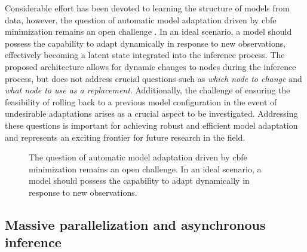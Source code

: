 Considerable effort has been devoted to learning the structure of models from data, however,
the question of automatic model adaptation driven by \ac{cbfe} minimization remains an open challenge \citep{beckers_principled_2022, friston_bayesian_2018}.
In an ideal scenario, a model should possess the capability to adapt dynamically in response
to new observations, effectively becoming a latent state integrated into the inference
process.
The proposed architecture allows for dynamic changes to nodes during the inference process, but
does not address crucial questions such as \textit{which node to change} and \textit{what node to use as a replacement}.
Additionally, the challenge of ensuring the feasibility of rolling back to a previous model
configuration in the event of undesirable adaptations arises as a crucial aspect to be
investigated.
Addressing these questions is important for achieving robust and efficient
model adaptation and represents an exciting frontier for future research in the field.
\begin{figure}
  \centering
  \resizebox{0.85\textwidth}{!}{}
  \caption{The question of automatic model adaptation driven by \ac{cbfe} minimization remains an open challenge.
  In an ideal scenario, a model should possess the capability to adapt dynamically in response
to new observations.}
  \label{fig:conclusion:adaptation}
\end{figure}

\subsection{Massive parallelization and asynchronous inference}


